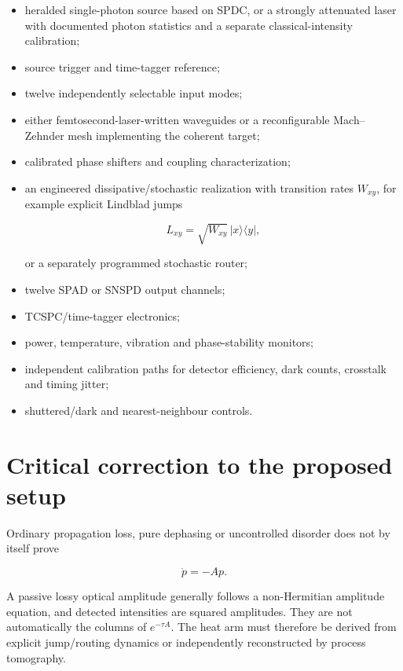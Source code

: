 \documentclass[11pt,a4paper,openany]{report}
\begin{document}
\begin{itemize}
\item 
heralded single-photon source based on SPDC, or a strongly attenuated laser with documented photon statistics and a separate classical-intensity calibration;

\item 
source trigger and time-tagger reference;

\item 
twelve independently selectable input modes;

\item 
either femtosecond-laser-written waveguides or a reconfigurable Mach--Zehnder mesh implementing the coherent target;

\item 
calibrated phase shifters and coupling characterization;

\item 
an engineered dissipative/\allowbreak{}stochastic realization with transition rates \(W_{xy}\), for example explicit Lindblad jumps

\[
L_{xy}=\sqrt{W_{xy}}\,|x\rangle\langle y|,
\]

or a separately programmed stochastic router;

\item 
twelve SPAD or SNSPD output channels;

\item 
TCSPC/\allowbreak{}time-tagger electronics;

\item 
power, temperature, vibration and phase-stability monitors;

\item 
independent calibration paths for detector efficiency, dark counts, crosstalk and timing jitter;

\item 
shuttered/\allowbreak{}dark and nearest-neighbour controls.

\end{itemize}

\section{Critical correction to the proposed setup}

Ordinary propagation loss, pure dephasing or uncontrolled disorder does not by itself prove

\[
\dot p=-Ap.
\]

A passive lossy optical amplitude generally follows a non-Hermitian amplitude equation, and detected intensities are squared amplitudes. They are not automatically the columns of \(e^{-\tau A}\). The heat arm must therefore be derived from explicit jump/\allowbreak{}routing dynamics or independently reconstructed by process tomography.
\end{document}
